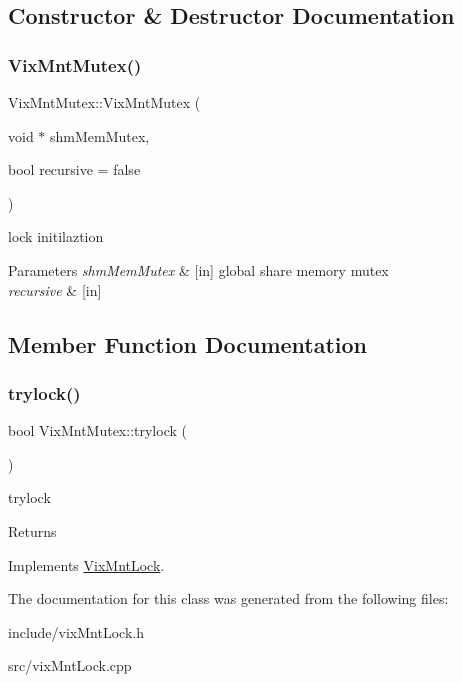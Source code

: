 \subsection{Constructor \& Destructor Documentation}
\hypertarget{class_vix_mnt_mutex_a165a9795c259086b0f2fe7786dcfb463}{}\label{class_vix_mnt_mutex_a165a9795c259086b0f2fe7786dcfb463} 
\subsubsection{\texorpdfstring{Vix\+Mnt\+Mutex()}{VixMntMutex()}}
{\ttfamily Vix\+Mnt\+Mutex\+::\+Vix\+Mnt\+Mutex (\begin{DoxyParamCaption}\item[{void $\ast$}]{shm\+Mem\+Mutex,  }\item[{bool}]{recursive = {\ttfamily false} }\end{DoxyParamCaption})}



lock initilaztion 


\begin{DoxyParams}{Parameters}
{\em shm\+Mem\+Mutex} & \mbox{[}in\mbox{]} global share memory mutex \\
\hline
{\em recursive} & \mbox{[}in\mbox{]} \\
\hline
\end{DoxyParams}


\subsection{Member Function Documentation}
\hypertarget{class_vix_mnt_mutex_a549c576daa2a99a87b78c5387cab8d92}{}\label{class_vix_mnt_mutex_a549c576daa2a99a87b78c5387cab8d92} 
\subsubsection{\texorpdfstring{trylock()}{trylock()}}
{\ttfamily bool Vix\+Mnt\+Mutex\+::trylock (\begin{DoxyParamCaption}{ }\end{DoxyParamCaption})\hspace{0.3cm}{\ttfamily [virtual]}}



trylock 

\begin{DoxyReturn}{Returns}

\end{DoxyReturn}


Implements \hyperlink{class_vix_mnt_lock}{Vix\+Mnt\+Lock}.



The documentation for this class was generated from the following files\+:\begin{DoxyCompactItemize}
\item 
include/vix\+Mnt\+Lock.\+h\item 
src/vix\+Mnt\+Lock.\+cpp\end{DoxyCompactItemize}
